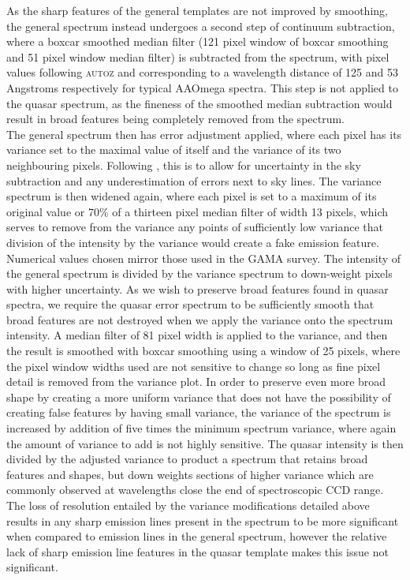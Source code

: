 \documentclass[iop]{emulateapj}
\newcommand{\autoz}{\textsc{autoz}}
\begin{document}
As the sharp features of the general templates are not improved by smoothing, the general spectrum instead undergoes a second step of continuum subtraction, where a boxcar smoothed median filter (121 pixel window of boxcar smoothing and 51 pixel window median filter) is subtracted from the spectrum, with pixel values following \autoz{} and corresponding to a wavelength distance of 125 and 53 Angstroms respectively for typical AAOmega spectra. This step is not applied to the quasar spectrum, as the fineness of the smoothed median subtraction would result in broad features being completely removed from the spectrum. \\

The general spectrum then has error adjustment applied, where each pixel has its variance set to the maximal value of itself and the variance of its two neighbouring pixels. Following \citet{baldry2014galaxy}, this is to allow for uncertainty in the sky subtraction and any underestimation of errors next to sky lines. The variance spectrum is then widened again, where each pixel is set to a maximum of its original value or 70\% of a thirteen pixel median filter of width 13 pixels, which serves to remove from the variance any points of sufficiently low variance that division of the intensity by the variance would create a fake emission feature. Numerical values chosen mirror those used in the GAMA survey. The intensity of the general spectrum is divided by the variance spectrum to down-weight pixels with higher uncertainty. As we wish to preserve broad features found in quasar spectra, we require the quasar error spectrum to be sufficiently smooth that broad features are not destroyed when we apply the variance onto the spectrum intensity. A median filter of 81 pixel width is applied to the variance, and then the result is smoothed with boxcar smoothing using a window of 25 pixels, where the pixel window widths used are not sensitive to change so long as fine pixel detail is removed from the variance plot. In order to preserve even more broad shape by creating a more uniform variance that does not have the possibility of creating false features by having small variance, the variance of the spectrum is increased by addition of five times the minimum spectrum variance, where again the amount of variance to add is not highly sensitive. The quasar intensity is then divided by the adjusted variance to product a spectrum that retains broad features and shapes, but down weights sections of higher variance which are commonly observed at wavelengths close the end of spectroscopic CCD range. The loss of resolution entailed by the variance modifications detailed above results in any sharp emission lines present in the spectrum to be more significant when compared to emission lines in the general spectrum, however the relative lack of sharp emission line features in the quasar template makes this issue not significant.\\
\end{document}
